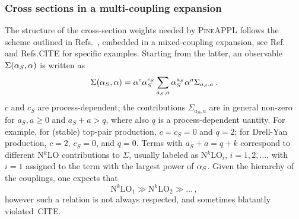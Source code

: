 \subsubsection{Cross sections in a multi-coupling expansion}
The structure of the cross-section weights needed by \textsc{PineAPPL} follows the scheme outlined in
Refs.~\cite{Frederix:2011ss, Bertone:2014zva}, embedded in a mixed-coupling expansion, see Ref.~\cite{Frederix:2018nkq} and Refs.CITE for
specific examples. Starting
from the latter, an observable $\Sigma(\alpha_{S}, \alpha)$ is written as
\begin{equation}
    \Sigma(\alpha_{S}, \alpha) = \alpha^c \alpha_{S}^{c_S} \sum_{a_S, a} \alpha_{S}^{a_S} \alpha^a \Sigma_{a_S, a}\,.
\end{equation}
$c$ and $c_S$ are process-dependent; the contributions $\Sigma_{a_S, a}$ are in general non-zero for $a_S, a \ge 0$ and $a_S + a > q$, where also $q$ is a process-dependent
uantity. For example,
for (stable) top-pair production, $c=c_S=0$ and $q=2$; for Drell-Yan production, $c=2$, $c_S=0$, and $q=0$. Terms
with  $a_S + a = q + k$ correspond to different N$^k$LO contributions to $\Sigma$, usually
labeled as N$^k$LO$_i$, $i =1,2, \ldots$, with $i=1$ assigned to the term with the largest power of $\alpha_{S}$. Given the hierarchy of the couplings,
one expects that
\begin{equation}
 \textrm{N}^k\textrm{LO}_1 \gg \textrm{N}^k\textrm{LO}_2 \gg\ldots \, ,
\end{equation}
however such a relation is not always respected, and sometimes blatantly violated~CITE.

